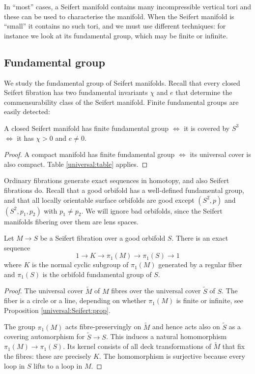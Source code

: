 In ``most'' cases, a Seifert manifold contains many incompressible vertical tori and these can be used to characterise the manifold. When the Seifert manifold is ``small'' it contains no such tori, and we must use different techniques: for instance we look at its fundamental group, which may be finite or infinite. 



\subsection{Fundamental group}
We study the fundamental group of Seifert manifolds. Recall that every closed Seifert fibration has two fundamental invariants $\chi$ and $e$ that determine the commensurability class of the Seifert manifold. Finite fundamental groups are easily detected:

\begin{prop}
A closed Seifert manifold has finite fundamental group $\Longleftrightarrow$ it is covered by $S^3$ $\Longleftrightarrow$ it has $\chi>0$ and $e\neq 0$.
\end{prop}
\begin{proof}
A compact manifold has finite fundamental group $\Longleftrightarrow$ its universal cover is also compact. Table \ref{universal:table} applies.
\end{proof}


Ordinary fibrations generate exact sequences in homotopy, and also Seifert fibrations do. Recall that a good orbifold has a well-defined fundamental group, and that all locally orientable surface orbifolds are good except $(S^2, p)$ and $(S^2, p_1, p_2)$ with $p_1\neq p_2$. We will ignore bad orbifolds, since the Seifert manifolds fibering over them are lens spaces.

\begin{prop}
Let $M \to S$ be a Seifert fibration over a good orbifold $S$. There is an exact sequence
$$1 \longrightarrow K \longrightarrow \pi_1(M) \longrightarrow \pi_1(S)\longrightarrow 1$$
where $K$ is the normal cyclic subgroup of $\pi_1(M)$ generated by a regular fiber and $\pi_1(S)$ is the orbifold fundamental group of $S$. 
\end{prop}
\begin{proof}
The universal cover $\tilde M$ of $M$ fibres over the universal cover $\tilde S$ of $S$. 
The fiber is a circle or a line, depending on whether $\pi_1(M)$ is finite or infinite, see Proposition \ref{universal:Seifert:prop}.

The group $\pi_1(M)$ acts fibre-preservingly on $\tilde M$ and hence acts also on $\tilde S$ as a covering automorphism for $\tilde S \to S$. This induces a natural homomorphism $\pi_1(M) \to \pi_1(S)$. Its kernel consists of all deck transformations of $\tilde M$ that fix the fibres: these are precisely $K$. The homomorphism is surjective because every loop in $S$ lifts to a loop in $M$.
\end{proof}


